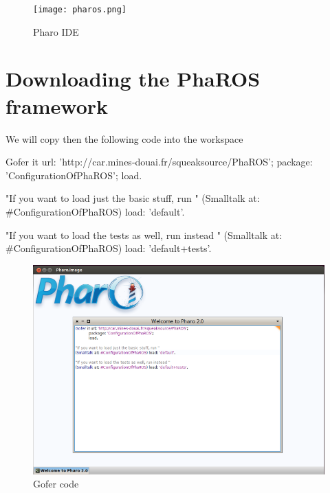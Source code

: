 \documentclass[a4paper,10pt,twoside]{book}
\begin{document}
					
					
							
						\begin{figure}[!htbp]
			  				\centering
    								\texttt{[image: pharos.png]}
								\caption{Pharo IDE}
							\centering
						\end{figure}
			
						
						
						\section{Downloading the PhaROS framework}
					
						We will copy then the following code into the workspace 
						
						 
						\begin{code}
							Gofer it url: 'http://car.mines-douai.fr/squeaksource/PhaROS'; 
			     					     package: 'ConfigurationOfPhaROS'; 
			     					     load.
								     
							"If you want to load just the basic stuff, run "
							(Smalltalk at: #ConfigurationOfPhaROS) load: 'default'.
							
							"If you want to load the tests as well, run instead "
							(Smalltalk at: #ConfigurationOfPhaROS) load: 'default+tests'.
						\end{code}
		

						\begin{figure}[!htbp]
			  				\centering
    								\includegraphics[width=1\textwidth]{GoferCodePhaROS.png}
								\caption{Gofer code}
							\centering
						\end{figure}
			
\end{document}
